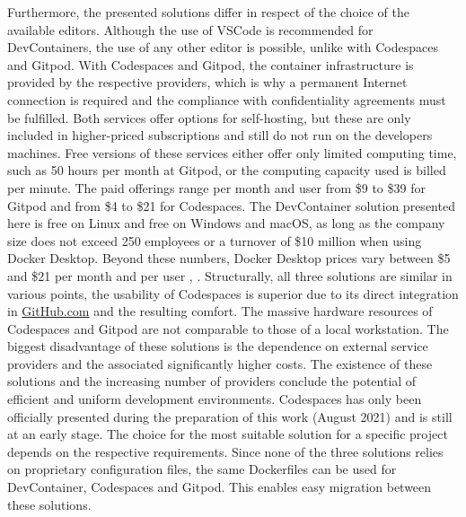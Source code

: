         Furthermore, the presented solutions differ in respect of the choice of the available editors. Although the use of \ac{VSCode} is recommended for DevContainers, the use of any other editor is possible, unlike with Codespaces and Gitpod. With Codespaces and Gitpod, the container infrastructure is provided by the respective providers, which is why a permanent Internet connection is required and the compliance with confidentiality agreements must be fulfilled. Both services offer options for self-hosting, but these are only included in higher-priced subscriptions and still do not run on the developers machines. Free versions of these services either offer only limited computing time, such as 50 hours per month at Gitpod, or the computing capacity used is billed per minute. The paid offerings range per month and user from \$9 to \$39 for Gitpod and from \$4 to \$21 for Codespaces. The DevContainer solution presented here is free on Linux and free on Windows and macOS, as long as the company size does not exceed 250 employees or a turnover of \$10 million when using Docker Desktop. Beyond these numbers, Docker Desktop prices vary between \$5 and \$21 per month and per user \cite{gitpod}, \cite{githubblogcodespace}.\newline
        Structurally, all three solutions are similar in various points, the usability of Codespaces is superior due to its direct integration in \href{https://www.GitHub.com}{GitHub.com} and the resulting comfort. The massive hardware resources of Codespaces and Gitpod are not comparable to those of a local workstation. The biggest disadvantage of these solutions is the dependence on external service providers and the associated significantly higher costs. The existence of these solutions and the increasing number of providers conclude the potential of efficient and uniform development environments. Codespaces has only been officially presented during the preparation of this work (August 2021) and is still at an early stage.
        The choice for the most suitable solution for a specific project depends on the respective requirements. Since none of the three solutions relies on proprietary configuration files, the same Dockerfiles can be used for DevContainer, Codespaces and Gitpod. This enables easy migration between these solutions.

